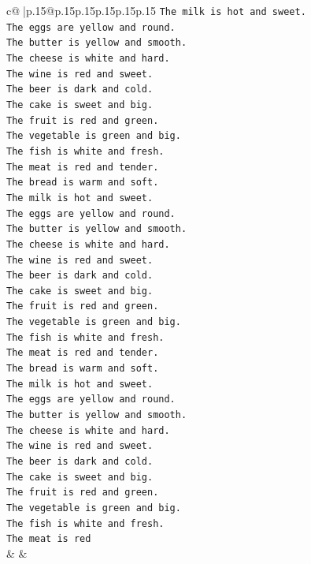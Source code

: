 \documentclass{article}
\begin{document}
{\begin{supertabular}{c@{$\;$}|p{.15\linewidth}@{}p{.15\linewidth}p{.15\linewidth}p{.15\linewidth}p{.15\linewidth}p{.15\linewidth}}
{{{\texttt{The milk is hot and sweet.} \\
\texttt{The eggs are yellow and round.} \\
\texttt{The butter is yellow and smooth.} \\
\texttt{The cheese is white and hard.} \\
\texttt{The wine is red and sweet.} \\
\texttt{The beer is dark and cold.} \\
\texttt{The cake is sweet and big.} \\
\texttt{The fruit is red and green.} \\
\texttt{The vegetable is green and big.} \\
\texttt{The fish is white and fresh.} \\
\texttt{The meat is red and tender.} \\
\texttt{The bread is warm and soft.} \\
\texttt{The milk is hot and sweet.} \\
\texttt{The eggs are yellow and round.} \\
\texttt{The butter is yellow and smooth.} \\
\texttt{The cheese is white and hard.} \\
\texttt{The wine is red and sweet.} \\
\texttt{The beer is dark and cold.} \\
\texttt{The cake is sweet and big.} \\
\texttt{The fruit is red and green.} \\
\texttt{The vegetable is green and big.} \\
\texttt{The fish is white and fresh.} \\
\texttt{The meat is red and tender.} \\
\texttt{The bread is warm and soft.} \\
\texttt{The milk is hot and sweet.} \\
\texttt{The eggs are yellow and round.} \\
\texttt{The butter is yellow and smooth.} \\
\texttt{The cheese is white and hard.} \\
\texttt{The wine is red and sweet.} \\
\texttt{The beer is dark and cold.} \\
\texttt{The cake is sweet and big.} \\
\texttt{The fruit is red and green.} \\
\texttt{The vegetable is green and big.} \\
\texttt{The fish is white and fresh.} \\
\texttt{The meat is red} \\
            }
        }
    }
    & & \\ \\


\end{supertabular}}
\end{document}
